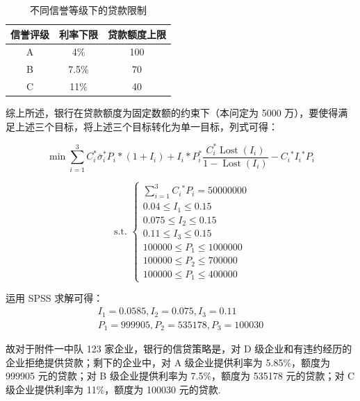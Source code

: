 \documentclass[UTF8]{ctexart}
\begin{document}
\begin{table}[!ht]
	\centering
	\caption{不同信誉等级下的贷款限制}
	\begin{tabular}{c c c}
		\hline
		信誉评级 & 利率下限 & 贷款额度上限 \\ \hline
		A        & 4\%      & 100          \\ \hline

		B        & 7.5\%    & 70           \\ \hline

		C        & 11\%     & 40           \\ \hline
	\end{tabular}
\end{table}

综上所述，银行在贷款额度为固定数额的约束下（本问定为 5000 万），要使得满足上述三个目标，将上述三个目标转化为单一目标，列式可得：

\begin{equation}
	\min \sum_{i=1}^{3} C_{i}^{*} \bar{\sigma}_{i}^{*} P_{i} *\left(1+I_{i}\right)+I_{i} * P_{i}^{*} \frac{C_{i}^{*} \operatorname{Lost}\left(I_{i}\right)}{1-\operatorname{Lost}\left(I_{i}\right)}-C_{i}{ }^{*} I_{i}{ }^{*} P_{i}
\end{equation}


\begin{equation}
	\text { s.t. }\left\{\begin{array}{l}
		\sum_{i=1}^{3} C_{i}{ }^{*} P_{i}=50000000 \\
		0.04 \leqslant I_{1} \leqslant 0.15        \\
		0.075 \leqslant I_{2} \leqslant 0.15       \\
		0.11 \leqslant I_{3} \leqslant 0.15        \\
		100000 \leqslant P_{1} \leqslant 1000000   \\
		100000 \leqslant P_{2} \leqslant 700000    \\
		100000 \leqslant P_{1} \leqslant 400000
	\end{array}\right.
\end{equation}

运用 SPSS 求解可得：
\begin{equation}
	\begin{array}{c}
		I_{1}=0.0585, I_{2}=0.075, I_{3}=0.11 \\
		P_{1}=999905, P_{2}=535178, P_{3}=100030
	\end{array}
\end{equation}

故对于附件一中队 123 家企业，银行的信贷策略是，对 D 级企业和有违约经历的企业拒绝提供贷款；剩下的企业中，对 A 级企业提供利率为 5.85\%，额度为 999905 元的贷款；对 B 级企业提供利率为 7.5\%，额度为 535178 元的贷款；对 C 级企业提供利率为 11\%，额度为 100030 元的贷款.
\end{document}
